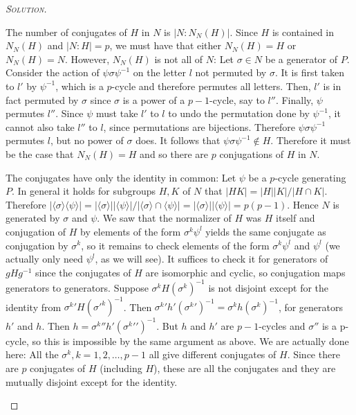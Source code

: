 \begin{proof}[{\scshape Solution}]
\begin{enumerate}[font=\normalfont,label=\textbf{(\Alph*)}, wide]
    The number of conjugates of $H$ in $N$ is $\lvert N : N_N(H) \rvert$. Since $H$ is contained in $N_N(H)$ and $\lvert N : H \rvert = p$, we must have that either $N_N(H) = H$ or $N_N(H) = N$. However, $N_N(H)$ is not all of $N$: Let $\sigma \in N$ be a generator of $P$. Consider the action of $\psi\sigma\psi^{-1}$ on the letter $l$ not permuted by $\sigma$. It is first taken to $l'$ by $\psi^{-1}$, which is a $p$-cycle and therefore permutes all letters. Then, $l'$ is in fact permuted by $\sigma$ since $\sigma$ is a power of a $p-1$-cycle, say to $l''$. Finally, $\psi$ permutes $l''$. Since $\psi$ must take $l'$ to $l$ to undo the permutation done by $\psi^{-1}$, it cannot also take $l''$ to $l$, since permutations are bijections. Therefore $\psi\sigma\psi^{-1}$ permutes $l$, but no power of $\sigma$ does. It follows that $\psi\sigma\psi^{-1} \not \in H$. Therefore it must be the case that $N_N(H) = H$ and so there are $p$ conjugations of $H$ in $N$.

    The conjugates have only the identity in common: Let $\psi$ be a $p$-cycle generating $P$. In general it holds for subgroups $H, K$ of $N$ that $\lvert HK \rvert = \lvert H\rvert \lvert K \rvert / \lvert H\cap K \rvert$. Therefore $\lvert \langle \sigma \rangle\langle \psi \rangle\rvert  = \lvert \langle \sigma \rangle \rvert\lvert \langle \psi \rangle\rvert/\lvert \langle \sigma \rangle \cap \langle \psi \rangle \rvert = \lvert \langle \sigma \rangle \rvert\lvert \langle \psi \rangle\rvert = p(p-1)$. Hence $N$ is generated by $\sigma$ and $\psi$. We saw that the normalizer of $H$ was $H$ itself and conjugation of $H$ by elements of the form $\sigma^k\psi^l$ yields the same conjugate as conjugation by $\sigma^k$, so it remains to check elements of the form $\sigma^k\psi^l$ and $\psi^l$ (we actually only need $\psi^l$, as we will see). It suffices to check it for generators of $gHg^{-1}$ since the conjugates of $H$ are isomorphic and cyclic, so conjugation maps generators to generators. Suppose $\sigma^k H(\sigma^k)^{-1}$ is not disjoint except for the identity from ${\sigma^k}'H({\sigma'}^k)^{-1}$. Then ${\sigma^k}'h'({\sigma^k}')^{-1} = \sigma^k h(\sigma^k)^{-1}$, for generators $h'$ and $h$. Then $h = {\sigma^k}{''}h'({\sigma^k}{'}')^{-1}$. But $h$ and $h'$ are $p-1$-cycles and $\sigma''$ is a p-cycle, so this is impossible by the same argument as above. We are actually done here: All the $\sigma^k, k = 1, 2, \ldots, p-1$ all give different conjugates of $H$. Since there are $p$ conjugates of $H$ (including $H$), these are all the conjugates and they are mutually disjoint except for the identity.


\end{enumerate}
\end{proof}
